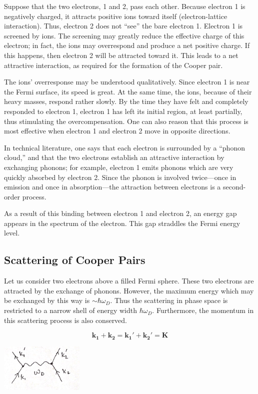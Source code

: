 \documentclass{article}
\begin{document}
Suppose that the two electrons, 1 and 2, pass each other. Because electron 1 is negatively charged, it attracts positive ions toward itself (electron-lattice interaction). Thus, electron 2 does not “see” the bare electron 1. Electron 1 is screened by ions. The screening may greatly reduce the effective charge of this electron; in fact, the ions may overrespond and produce a net positive charge. If this happens, then electron 2 will be attracted toward it. This leads to a net attractive interaction, as required for the formation of the Cooper pair.

The ions' overresponse may be understood qualitatively. Since electron 1 is near the Fermi surface, its speed is great. At the same time, the ions, because of their heavy masses, respond rather slowly. By the time they have felt and completely responded to electron 1, electron 1 has left its initial region, at least partially, thus stimulating the overcompensation. One can also reason that this process is most effective when electron 1 and electron 2 move in opposite directions.

In technical literature, one says that each electron is surrounded by a “phonon cloud,” and that the two electrons establish an attractive interaction by exchanging phonons; for example, electron 1 emits phonons which are very quickly absorbed by electron 2. Since the phonon is involved twice—once in emission and once in absorption—the attraction between electrons is a second-order process.

As a result of this binding between electron 1 and electron 2, an energy gap appears in the spectrum of the electron. This gap straddles the Fermi energy level.

\subsection{Scattering of Cooper Pairs}

Let us consider two electrons above a filled Fermi sphere. These two electrons are attracted by the exchange of phonons. However, the maximum energy which may be exchanged by this way is $\sim \hbar \omega_D$. Thus the scattering in phase space is restricted to a narrow shell of energy width $\hbar \omega_D$. Furthermore, the momentum in this scattering process is also conserved.

\[
\mathbf{k_1} + \mathbf{k_2} = \mathbf{k_1'} + \mathbf{k_2'} = \mathbf{K}
\]

\begin{center}
    \includegraphics[width=0.3\textwidth]{figures/scattering_diagram_1.png}
\end{center}
\end{document}
